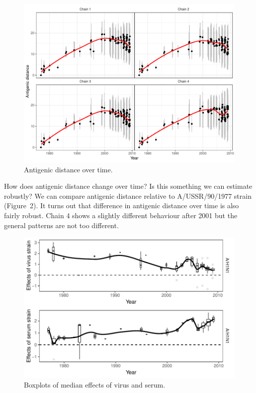 \documentclass[12pt]{article}
\begin{document}
\begin{figure}
\includegraphics[width=\textwidth]{../figure/h1n1_distance.pdf}
\caption{
Antigenic distance over time.
}
\end{figure}

How does antigenic distance change over time? Is this something we can estimate robustly?
We can compare antigenic distance relative to A/USSR/90/1977 strain (Figure~2).
It turns out that difference in antigenic distance over time is also fairly robust.
Chain 4 shows a slightly different behaviour after 2001 but the general patterns are not too different.

\begin{figure}
\includegraphics[width=\textwidth]{../figure/h1n1_effect.pdf}
\caption{Boxplots of median effects of virus and serum.}
\end{figure}
\end{document}
